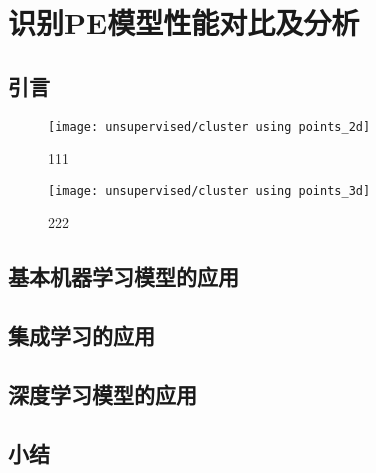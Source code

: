 \chapter{识别PE模型性能对比及分析}
\section{引言}
\begin{figure}[htbp]
    \centering
    \texttt{[image: unsupervised/cluster using points\_2d]}
    \caption[]{\label{fig:cluster2d}111}
\end{figure}
\begin{figure}[htbp]
    \centering
    \texttt{[image: unsupervised/cluster using points\_3d]}
    \caption[]{\label{fig:cluster3d}222}
\end{figure}
\section{基本机器学习模型的应用}
\section{集成学习的应用}
\section{深度学习模型的应用}
\section{小结}
